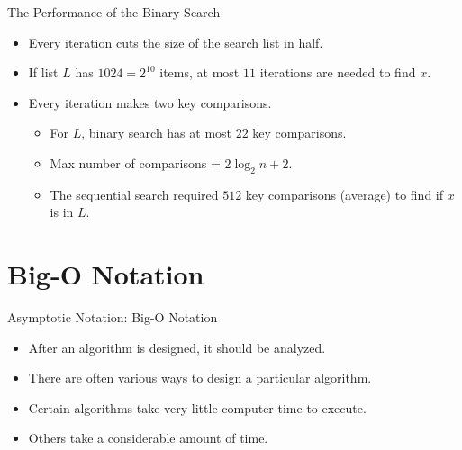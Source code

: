 \documentclass[14pt,aspectratio=1610]{beamer}
\begin{document}
\begin{frame}{The Performance of the Binary Search}
\begin{itemize}[<+->]
  \item
    Every iteration cuts the size of the search list in half.
  \item
    If list $L$ has $1024 = 2^{10}$ items, at most $11$ iterations are needed to find $x$.
  \item
    Every iteration makes two key comparisons.
    \begin{itemize}
      \item
        For $L$, binary search has at most $22$ key comparisons.
      \item
        Max number of comparisons = $2\log_2n+2$.
      \item
        The sequential search required $512$ key comparisons (average) to find if $x$ is in $L$.
    \end{itemize}
\end{itemize}
\end{frame}

\section{Big-O Notation}

\begin{frame}{Asymptotic Notation: Big-O Notation}
\begin{itemize}[<+->]
  \item
    After an algorithm is designed, it should be analyzed.
  \item
    There are often various ways to design a particular algorithm.
  \item
    Certain algorithms take very little computer time to execute.
  \item
    Others take a considerable amount of time.
\end{itemize}
\end{frame}
\end{document}
